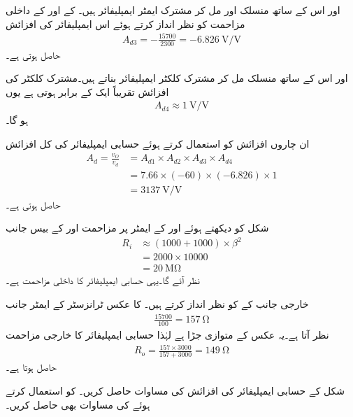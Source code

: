  اور اس کے ساتھ منسلک  اور  مل کر مشترک ایمٹر ایمپلیفائر ہیں۔ کے  اور  کے داخلی مزاحمت کو نظر انداز کرتے ہوئے اس ایمپلیفائر کی افزائش
\begin{align*}
A_{d3}=-\frac{15700}{2300}=\SI{-6.826}{\volt \per \volt}
\end{align*}
حاصل ہوتی ہے۔

 اور اس کے ساتھ منسلک  مل کر مشترک کلکٹر ایمپلیفائر بناتے ہیں۔مشترک کلکٹر کی افزائش تقریباً ایک کے برابر ہوتی ہے یوں
\begin{align*}
A_{d4} \approx \SI{1}{\volt \per \volt}
\end{align*}
ہو گا۔

ان چاروں افزائش کو استعمال کرتے ہوئے حسابی ایمپلیفائر کی کل افزائش
\begin{align*}
A_d=\frac{v_O}{v_d}&=A_{d1} \times A_{d2} \times  A_{d3} \times A_{d4}\\
&=7.66 \times \left(-60\right) \times \left(-6.826 \right) \times 1\\
&=\SI{3137}{\volt \per \volt}
\end{align*}
حاصل ہوتی ہے۔

شکل   کو دیکھتے ہوئے  اور  کے ایمٹر پر  مزاحمت  اور  کے بیس جانب
\begin{align*}
R_i & \approx \left(1000+1000 \right) \times \beta^2\\
&=2000 \times 10000\\
&=\SI{20}{\mega \ohm}
\end{align*}
نظر آئے گا۔یہی حسابی ایمپلیفائر کا داخلی مزاحمت ہے۔

خارجی جانب  کے  کو نظر انداز کرتے ہیں۔ کا عکس ٹرانزسٹر کے ایمٹر جانب 
\begin{align*}
\frac{15700}{100}=\SI{157}{\ohm}
\end{align*}
نظر آتا ہے۔یہ عکس  کے متوازی جڑا ہے لہٰذا حسابی ایمپلیفائر کا خارجی مزاحمت
\begin{align*}
R_o=\frac{157 \times 3000}{157+3000} =\SI{149}{\ohm}
\end{align*}
حاصل ہوتا ہے۔

شکل  کے حسابی ایمپلیفائر کی افزائش  کی مساوات حاصل کریں۔ کو استعمال کرتے ہوئے  کی مساوات بھی حاصل کریں۔


